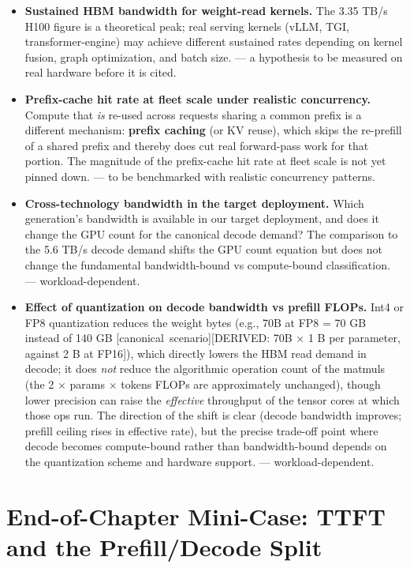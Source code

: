 \begin{itemize}
\item
  \textbf{Sustained HBM bandwidth for weight-read kernels.} The 3.35
  TB/s H100 figure is a theoretical peak; real serving kernels (vLLM,
  TGI, transformer-engine) may achieve different sustained rates
  depending on kernel fusion, graph optimization, and batch size. --- a
  hypothesis to be measured on real hardware before it is cited.
\item
  \textbf{Prefix-cache hit rate at fleet scale under realistic
  concurrency.} Compute that \emph{is} re-used across requests sharing a
  common prefix is a different mechanism: \textbf{prefix caching} (or KV
  reuse), which skips the re-prefill of a shared prefix and thereby does
  cut real forward-pass work for that portion. The magnitude of the
  prefix-cache hit rate at fleet scale is not yet pinned down. --- to be
  benchmarked with realistic concurrency patterns.
\item
  \textbf{Cross-technology bandwidth in the target deployment.} Which
  generation's bandwidth is available in our target deployment, and does
  it change the GPU count for the canonical decode demand? The
  comparison to the 5.6 TB/s decode demand shifts the GPU count equation
  but does not change the fundamental bandwidth-bound vs compute-bound
  classification. --- workload-dependent.
\item
  \textbf{Effect of quantization on decode bandwidth vs prefill FLOPs.}
  Int4 or FP8 quantization reduces the weight bytes (e.g., 70B at FP8 =
  70 GB instead of 140 GB \mbox{{[}canonical scenario{]}}{[}DERIVED: 70B × 1 B
  per parameter, against 2 B at FP16{]}), which directly lowers the HBM
  read demand in decode; it does \emph{not} reduce the algorithmic
  operation count of the matmuls (the 2 × params × tokens FLOPs are
  approximately unchanged), though lower precision can raise the
  \emph{effective} throughput of the tensor cores at which those ops
  run. The direction of the shift is clear (decode bandwidth improves;
  prefill ceiling rises in effective rate), but the precise trade-off
  point where decode becomes compute-bound rather than bandwidth-bound
  depends on the quantization scheme and hardware support. ---
  workload-dependent.
\end{itemize}

\section{End-of-Chapter Mini-Case: TTFT and the Prefill/Decode
Split}\label{end-of-chapter-mini-case-ttft-and-the-prefilldecode-split}


